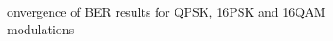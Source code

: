 \begin{figure}[ht!]
    \begin{center}
        
        \caption{onvergence of BER results for QPSK, 16PSK and 16QAM modulations}
    \end{center} \label{fig:1}
\end{figure}

